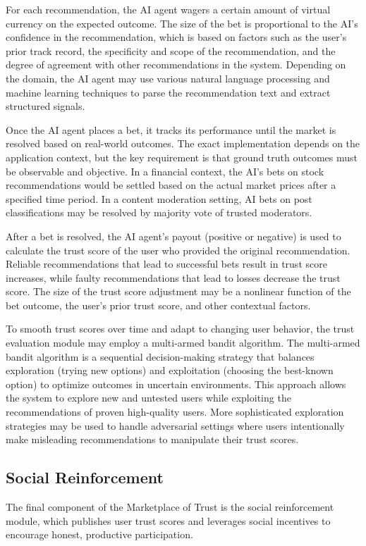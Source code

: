 \documentclass{article}
\begin{document}
For each recommendation, the AI agent wagers a certain amount of virtual currency on the expected outcome. The size of the bet is proportional to the AI's confidence in the recommendation, which is based on factors such as the user's prior track record, the specificity and scope of the recommendation, and the degree of agreement with other recommendations in the system. Depending on the domain, the AI agent may use various natural language processing and machine learning techniques to parse the recommendation text and extract structured signals.

Once the AI agent places a bet, it tracks its performance until the market is resolved based on real-world outcomes. The exact implementation depends on the application context, but the key requirement is that ground truth outcomes must be observable and objective. In a financial context, the AI's bets on stock recommendations would be settled based on the actual market prices after a specified time period. In a content moderation setting, AI bets on post classifications may be resolved by majority vote of trusted moderators.

After a bet is resolved, the AI agent's payout (positive or negative) is used to calculate the trust score of the user who provided the original recommendation. Reliable recommendations that lead to successful bets result in trust score increases, while faulty recommendations that lead to losses decrease the trust score. The size of the trust score adjustment may be a nonlinear function of the bet outcome, the user's prior trust score, and other contextual factors.

To smooth trust scores over time and adapt to changing user behavior, the trust evaluation module may employ a multi-armed bandit algorithm. The multi-armed bandit algorithm is a sequential decision-making strategy that balances exploration (trying new options) and exploitation (choosing the best-known option) to optimize outcomes in uncertain environments. \cite{multiarmedbandits} This approach allows the system to explore new and untested users while exploiting the recommendations of proven high-quality users. More sophisticated exploration strategies may be used to handle adversarial settings where users intentionally make misleading recommendations to manipulate their trust scores.

\subsection{Social Reinforcement}
The final component of the Marketplace of Trust is the social reinforcement module, which publishes user trust scores and leverages social incentives to encourage honest, productive participation.  
\end{document}
